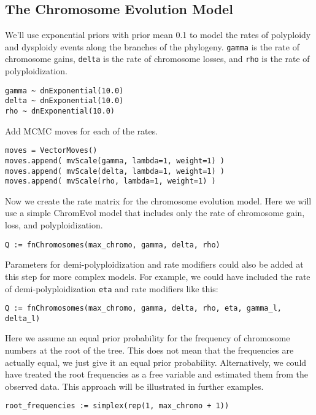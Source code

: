 \bigskip
\subsection{The Chromosome Evolution Model}


We'll use exponential priors with prior mean 0.1 to model the rates of polyploidy and 
dysploidy events along the branches of the phylogeny.
\texttt{gamma} is the rate of chromosome gains,
\texttt{delta} is the rate of chromosome losses, and
\texttt{rho} is the rate of polyploidization.
{\tt \begin{snugshade*}
\begin{lstlisting}
gamma ~ dnExponential(10.0)
delta ~ dnExponential(10.0)
rho ~ dnExponential(10.0)
\end{lstlisting}
\end{snugshade*}}

Add MCMC moves for each of the rates. 
{\tt \begin{snugshade*}
\begin{lstlisting}
moves = VectorMoves()
moves.append( mvScale(gamma, lambda=1, weight=1) )
moves.append( mvScale(delta, lambda=1, weight=1) )
moves.append( mvScale(rho, lambda=1, weight=1) )
\end{lstlisting}
\end{snugshade*}}

Now we create the rate matrix for the chromosome evolution model.
Here we will use a simple ChromEvol model that includes
only the rate of chromosome gain, loss, and polyploidization.
{\tt \begin{snugshade*}
\begin{lstlisting}
Q := fnChromosomes(max_chromo, gamma, delta, rho)
\end{lstlisting}
\end{snugshade*}}

Parameters for demi-polyploidization and rate modifiers could also
be added at this step for more complex models. For example, we
could have included the rate of demi-polyploidization \texttt{eta} 
and rate modifiers like this:
{\tt \begin{snugshade*}
\begin{lstlisting}
Q := fnChromosomes(max_chromo, gamma, delta, rho, eta, gamma_l, delta_l)
\end{lstlisting}
\end{snugshade*}}

Here we assume an equal prior probability for the frequency of chromosome numbers at the root of the tree. 
This does not mean that the frequencies are actually equal, we just give it an equal prior probability.
Alternatively, we could have treated the root frequencies as a free variable and estimated them from the observed data. 
This approach will be illustrated in further examples.
{\tt \begin{snugshade*}
\begin{lstlisting}
root_frequencies := simplex(rep(1, max_chromo + 1))
\end{lstlisting}
\end{snugshade*}}

